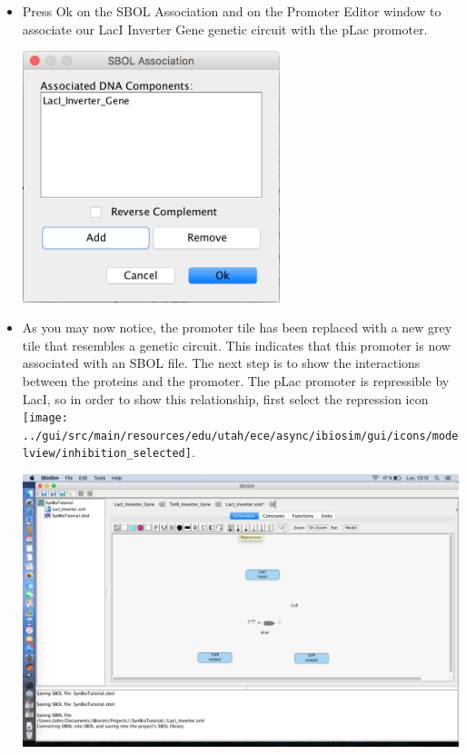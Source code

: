 \documentclass[titlepage,11pt]{article}
\begin{document}
\begin{itemize}
\item Press Ok on the SBOL Association and on the Promoter Editor window to associate our LacI Inverter Gene genetic circuit with the pLac promoter.

\begin{center}
\includegraphics[width=75mm]{"screenshots/SBOL Association pLac"}
\end{center}

\item As you may now notice, the promoter tile has been replaced with a new grey tile that resembles a genetic circuit. This indicates that this promoter is now associated with an SBOL file. The next step is to show the interactions between the proteins and the promoter. The pLac promoter is repressible by LacI, so in order to show this relationship, first select the repression icon \texttt{[image: ../gui/src/main/resources/edu/utah/ece/async/ibiosim/gui/icons/modelview/inhibition\_selected]}.

\begin{center}
\includegraphics[width=160mm]{screenshots/RepressionArc}
\end{center}


\end{itemize}
\end{document}
